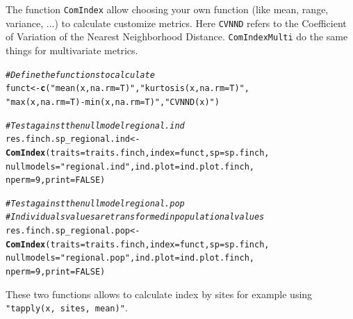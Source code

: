 \documentclass[12pt]{article}\usepackage[]{graphicx}\usepackage[]{color}
\makeatletter
\newcommand{\hlnum}[1]{\textcolor[rgb]{0.686,0.059,0.569}{#1}}%
\newcommand{\hlstr}[1]{\textcolor[rgb]{0.192,0.494,0.8}{#1}}%
\newcommand{\hlcom}[1]{\textcolor[rgb]{0.678,0.584,0.686}{\textit{#1}}}%
\newcommand{\hlstd}[1]{\textcolor[rgb]{0.345,0.345,0.345}{#1}}%
\newcommand{\hlkwb}[1]{\textcolor[rgb]{0.69,0.353,0.396}{#1}}%
\newcommand{\hlkwc}[1]{\textcolor[rgb]{0.333,0.667,0.333}{#1}}%
\newcommand{\hlkwd}[1]{\textcolor[rgb]{0.737,0.353,0.396}{\textbf{#1}}}%
\newenvironment{kframe}{%
 \def\at@end@of@kframe{}%
 \ifinner\ifhmode%
  \def\at@end@of@kframe{\end{minipage}}%
  \begin{minipage}{\columnwidth}%
 \fi\fi%
 \def\FrameCommand##1{\hskip\@totalleftmargin \hskip-\fboxsep
 \colorbox{shadecolor}{##1}\hskip-\fboxsep
     \hskip-\linewidth \hskip-\@totalleftmargin \hskip\columnwidth}%
 \MakeFramed {\advance\hsize-\width
   \@totalleftmargin\z@ \linewidth\hsize
   \@setminipage}}%
 {\par\unskip\endMakeFramed%
 \at@end@of@kframe}
\newenvironment{knitrout}{}{} %
\newcommand{\code}[1]{{{\tt #1}}}
\makeatother
\begin{document}
The function \texttt{ComIndex} allow choosing your own function (like mean, range, variance, ...) to calculate customize metrics. Here \texttt{CVNND} refers to the Coefficient of Variation of the Nearest Neighborhood Distance. \texttt{ComIndexMulti} do the same things for multivariate metrics. 

\begin{knitrout}
\color{fgcolor}\begin{kframe}
\begin{alltt}
\hlcom{#Define the function s to calculate}
\hlstd{funct}\hlkwb{<-}\hlkwd{c}\hlstd{(}\hlstr{"mean(x, na.rm = T)"}\hlstd{,} \hlstr{"kurtosis(x, na.rm = T)"}\hlstd{,}
     \hlstr{"max(x, na.rm = T) - min(x, na.rm = T)"}\hlstd{,} \hlstr{"CVNND(x)"} \hlstd{)}

\hlcom{#Test against the null model regional.ind}
\hlstd{res.finch.sp_regional.ind}\hlkwb{<-}\hlkwd{ComIndex}\hlstd{(}\hlkwc{traits} \hlstd{= traits.finch,} \hlkwc{index} \hlstd{= funct,} \hlkwc{sp} \hlstd{= sp.finch,}
                           \hlkwc{nullmodels} \hlstd{=} \hlstr{"regional.ind"}\hlstd{,} \hlkwc{ind.plot} \hlstd{= ind.plot.finch,}
                            \hlkwc{nperm} \hlstd{=} \hlnum{9}\hlstd{,} \hlkwc{print} \hlstd{=} \hlnum{FALSE}\hlstd{)}
\end{alltt}


{\ttfamily\noindent\bfseries\color{errorcolor}{\#\# Error: objet 's' introuvable}}\begin{alltt}
\hlcom{#Test against the null model regional.pop}
\hlcom{#Individuals values are transformed in populational values}
\hlstd{res.finch.sp_regional.pop}\hlkwb{<-}\hlkwd{ComIndex}\hlstd{(}\hlkwc{traits} \hlstd{= traits.finch,} \hlkwc{index} \hlstd{= funct,} \hlkwc{sp} \hlstd{= sp.finch,}
               \hlkwc{nullmodels} \hlstd{=} \hlstr{"regional.pop"}\hlstd{,} \hlkwc{ind.plot} \hlstd{= ind.plot.finch,}
               \hlkwc{nperm} \hlstd{=} \hlnum{9}\hlstd{,} \hlkwc{print} \hlstd{=} \hlnum{FALSE}\hlstd{)}
\end{alltt}
\end{kframe}
\end{knitrout}

These two functions allows to calculate  index by sites for example using \code{"tapply(x, sites, mean)"}.
\end{document}
